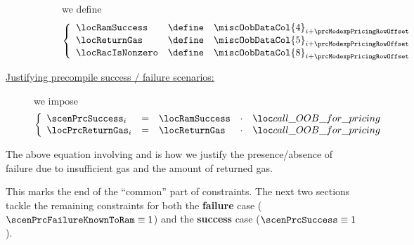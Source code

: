 \begin{description}
\begin{description}
						we define
						\[
							\left\{ \begin{array}{lcl}
								\locRamSuccess   & \define & \miscOobDataCol{4}   _{i + \prcModexpPricingRowOffset} \\
								\locReturnGas    & \define & \miscOobDataCol{5}   _{i + \prcModexpPricingRowOffset} \\
								\locRacIsNonzero & \define & \miscOobDataCol{8}   _{i + \prcModexpPricingRowOffset} \\
							\end{array} \right.
						\]
				\end{description}
			\item[\underline{\underline{Justifying precompile success / failure scenarios:}}] 
				we impose
				\[
					\left\{ \begin{array}{lclcl}
						\scenPrcSuccess  _{i} & = & \locRamSuccess & \cdot & \locCallOobForModexpPricing \\
						\locPrcReturnGas _{i} & = & \locReturnGas  & \cdot & \locCallOobForModexpPricing \\
					\end{array} \right.
				\]
		\end{description}
		\saNote{} The above equation involving \scenPrcFailure{} and \locPrcReturnGas{} is how we justify the presence/absence of failure due to insufficient gas and the amount of returned gas.

		This marks the end of the ``common'' part of constraints.
		The next two sections tackle the remaining constraints for both the
		\textbf{failure} case ($\scenPrcFailureKnownToRam \equiv 1$) and the
		\textbf{success} case ($\scenPrcSuccess \equiv 1$).
